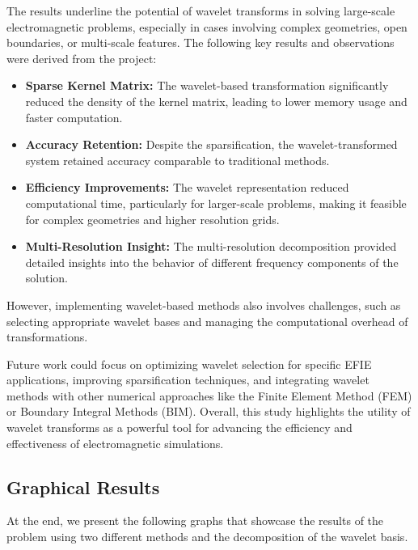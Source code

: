 \documentclass[12pt]{article}
\begin{document}
The results underline the potential of wavelet transforms in solving large-scale electromagnetic problems, especially in cases involving complex geometries, open boundaries, or multi-scale features. The following key results and observations were derived from the project:

\begin{itemize}
    \item \textbf{Sparse Kernel Matrix:} The wavelet-based transformation significantly reduced the density of the kernel matrix, leading to lower memory usage and faster computation.
    \item \textbf{Accuracy Retention:} Despite the sparsification, the wavelet-transformed system retained accuracy comparable to traditional methods.
    \item \textbf{Efficiency Improvements:} The wavelet representation reduced computational time, particularly for larger-scale problems, making it feasible for complex geometries and higher resolution grids.
    \item \textbf{Multi-Resolution Insight:} The multi-resolution decomposition provided detailed insights into the behavior of different frequency components of the solution.
\end{itemize}

However, implementing wavelet-based methods also involves challenges, such as selecting appropriate wavelet bases and managing the computational overhead of transformations.

Future work could focus on optimizing wavelet selection for specific EFIE applications, improving sparsification techniques, and integrating wavelet methods with other numerical approaches like the Finite Element Method (FEM) or Boundary Integral Methods (BIM). Overall, this study highlights the utility of wavelet transforms as a powerful tool for advancing the efficiency and effectiveness of electromagnetic simulations.

\subsection{Graphical Results}
At the end, we present the following graphs that showcase the results of the problem using two different methods and the decomposition of the wavelet basis.
\end{document}
